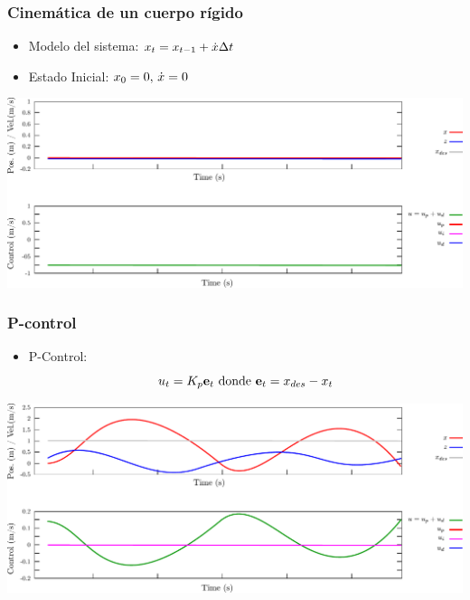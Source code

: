 \begin{frame}
    \frametitle{Cinemática de un cuerpo rígido}
    
    \begin{itemize}
        \item Modelo del sistema: $x_{t} = x_{t-1} + \dot{x} \Delta t$
        \item Estado Inicial: $x_{0} = 0, \, \dot{x} = 0$
    \end{itemize}
    
    
    \begin{center}
        \includegraphics[width=0.8\columnwidth]{images/pid_control_position_initial_state.pdf}
    \end{center}
    
\end{frame}

\begin{frame}
    \frametitle{P-control}
    
    \begin{itemize}
        \item P-Control:
        \begin{equation*}
            u_{t} = K_{p} \boldsymbol{\mathbf{e}}_{t} \text{ donde } \boldsymbol{\mathbf{e}}_{t} = x_{des} - x_{t}
        \end{equation*}
    \end{itemize}

    \begin{center}
        \includegraphics[width=0.8\columnwidth]{images/pid_control_position_proportional.pdf}
    \end{center}
    
\end{frame}


